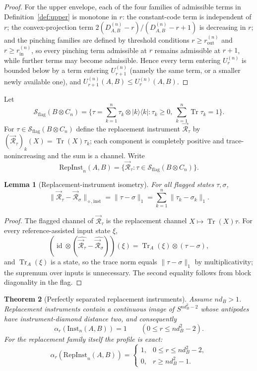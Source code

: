 \documentclass[11pt,a4paper]{article}
\newtheorem{theorem}{Theorem}[section]
\newtheorem{lemma}[theorem]{Lemma}
\newcommand{\Sstate}{\mathcal{S}}
\newcommand{\Inst}{\mathrm{Inst}}
\newcommand{\RepInst}{\mathrm{RepInst}}
\newcommand{\Tr}{\operatorname{Tr}}
\newcommand{\id}{\operatorname{id}}
\begin{document}
\begin{proof}
For the upper envelope, each of the four families of admissible terms in Definition~\ref{def:upper} is monotone in $r$: the constant-code term is independent of $r$; the convex-projection term $2(D_{A,B}^{(n)}-r)/(D_{A,B}^{(n)}-r+1)$ is decreasing in $r$; and the pinching families are defined by threshold conditions $r\ge r_{\mathrm{out}}^{(n)}$ and $r\ge r_{\mathrm{in}}^{(n)}$, so every pinching term admissible at $r$ remains admissible at $r+1$, while further terms may become admissible. Hence every term entering $U_r^{(n)}$ is bounded below by a term entering $U_{r+1}^{(n)}$ (namely the same term, or a smaller newly available one), and $U_{r+1}^{(n)}(A,B)\le U_r^{(n)}(A,B)$.
\end{proof}

Let
\[
\Sstate_{\mathrm{flag}}(B\otimes C_n)
=\Big\{\tau=\sum_{k=1}^n\tau_k\otimes|k\rangle\langle k|:
\tau_k\ge0,\ \sum_{k=1}^n\Tr\tau_k=1\Big\}.
\]
For $\tau\in\Sstate_{\mathrm{flag}}(B\otimes C_n)$ define the replacement instrument $\vec{\mathcal R}_\tau$ by $(\vec{\mathcal R}_\tau)_k(X)=\Tr(X)\tau_k$; each component is completely positive and trace-nonincreasing and the sum is a channel. Write
\[
\RepInst_n(A,B)=\{\vec{\mathcal R}_\tau:\tau\in\Sstate_{\mathrm{flag}}(B\otimes C_n)\}.
\]

\begin{lemma}[Replacement-instrument isometry]
\label{lem:replacement-isometry}
For all flagged states $\tau,\sigma$,
\[
\|\vec{\mathcal R}_\tau-\vec{\mathcal R}_\sigma\|_{\diamond,\mathrm{inst}}
=\|\tau-\sigma\|_1=\sum_{k=1}^n\|\tau_k-\sigma_k\|_1.
\]
\end{lemma}

\begin{proof}
The flagged channel of $\vec{\mathcal R}_\tau$ is the replacement channel $X\mapsto\Tr(X)\tau$. For every reference-assisted input state $\xi$,
\[
(\id\otimes(\widehat{\vec{\mathcal R}_\tau}-\widehat{\vec{\mathcal R}_\sigma}))(\xi)
=\Tr_A(\xi)\otimes(\tau-\sigma),
\]
and $\Tr_A(\xi)$ is a state, so the trace norm equals $\|\tau-\sigma\|_1$ by multiplicativity; the supremum over inputs is unnecessary. The second equality follows from block diagonality in the flag.
\end{proof}

\begin{theorem}[Perfectly separated replacement instruments]
\label{thm:replacement-profile}
Assume $nd_B>1$. Replacement instruments contain a continuous image of $S^{nd_B^2-2}$ whose antipodes have instrument-diamond distance two, and consequently
\[
\alpha_r(\Inst_n(A,B))=1\qquad(0\le r\le nd_B^2-2).
\]
For the replacement family itself the profile is exact:
\[
\alpha_r(\RepInst_n(A,B))=
\begin{cases}
1,&0\le r\le nd_B^2-2,\\
0,&r\ge nd_B^2-1.
\end{cases}
\]
\end{theorem}
\end{document}
